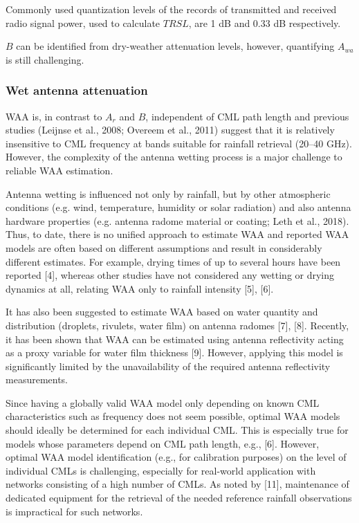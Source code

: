 \documentclass{ctuthesis}\usepackage[]{graphicx}\usepackage[]{color}
\begin{document}
Commonly used quantization levels of the records of transmitted and received radio signal power, used to calculate $TRSL$, are 1 dB and 0.33 dB respectively. 

$B$ can be identified from dry-weather attenuation levels, however, quantifying $A_{wa}$ is still challenging.




\subsubsection{Wet antenna attenuation}

WAA is, in contrast to $A_r$ and $B$, independent of CML path length and previous studies (Leijnse et al., 2008; Overeem et al., 2011) suggest that it is relatively insensitive to CML frequency at bands suitable for rainfall retrieval (20--40 GHz). However, the complexity of the antenna wetting process is a major challenge to reliable WAA estimation. 

Antenna wetting is influenced not only by rainfall, but by other atmospheric conditions (e.g. wind, temperature, humidity or solar radiation) and also  antenna hardware properties (e.g. antenna radome material or coating; Leth et al., 2018). Thus, to date, there is no unified approach to estimate WAA and reported WAA models are often based on different assumptions and result in considerably different estimates. For example, drying times of up to several hours have been reported [4], whereas other studies have not considered any wetting or drying dynamics at all, relating WAA only to rainfall intensity [5], [6]. 

It has also been suggested to estimate WAA based on water quantity and distribution (droplets, rivulets, water film) on antenna radomes [7], [8]. Recently, it has been shown that WAA can be estimated using antenna reflectivity acting as a proxy variable for water film thickness [9]. However, applying this model is significantly limited by the unavailability of the required antenna reflectivity measurements.

Since having a globally valid WAA model only depending on known CML characteristics such as frequency does not seem possible, optimal WAA models should ideally be determined for each individual CML. This is especially true for models whose parameters depend on CML path length, e.g., [6]. However, optimal WAA model identification (e.g., for calibration purposes) on the level of individual CMLs is challenging, especially for real-world application with networks consisting of a high number of CMLs. As noted by [11], maintenance of dedicated equipment for the retrieval of the needed reference rainfall observations is impractical for such networks. 
\end{document}
